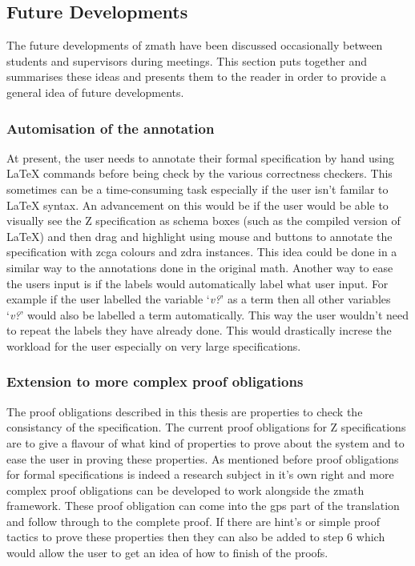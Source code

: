 \subsection{Future Developments}
\label{subsec:futuredevelopments}

The future developments of \gls{zmath} have been discussed occasionally between students and supervisors during meetings. This section puts together and summarises these ideas and presents them to the reader in order to provide a general idea of future developments.

\subsubsection{Automisation of the annotation}
\label{subsubsec:automisation}

At present, the user needs to annotate their formal specification by hand using \LaTeX{} commands before being check by the various correctness checkers. This sometimes can be a time-consuming task especially if the user isn't familar to \LaTeX{} syntax. An advancement on this would be if the user would be able to visually see the Z specification as schema boxes (such as the compiled version of \LaTeX{}) and then drag and highlight using mouse and buttons to annotate the specification with \gls{zcga} colours and \gls{zdra} instances. This idea could be done in a similar way to the annotations done in the original \gls{math}. Another way to ease the users input is if the labels would automatically label what user input. For example if the user labelled the variable `\emph{v?}' as a term then all other variables `\emph{v?}' would also be labelled a term automatically. This way the user wouldn't need to repeat the labels they have already done. This would drastically increse the workload for the user especially on very large specifications.

\subsubsection{Extension to more complex proof obligations}
\label{subsubsec:extenproofobli}

The proof obligations described in this thesis are properties to check the consistancy of the specification. The current proof obligations for Z specifications are to give a flavour of what kind of properties to prove about the system and to ease the user in proving these properties. As mentioned before proof obligations for formal specifications is indeed a research subject in it's own right and more complex proof obligations can be developed to work alongside the \gls{zmath} framework. These proof obligation can come into the \gls{gps} part of the translation and follow through to the complete proof. If there are hint's or simple proof tactics to prove these properties then they can also be added to step 6 which would allow the user to get an idea of how to finish of the proofs.

